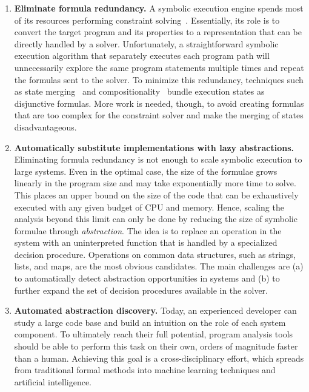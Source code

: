 \begin{enumerate}
\item \textbf{Eliminate formula redundancy.}  A symbolic execution engine spends most of its resources performing constraint solving~\cite{klee}.  Essentially, its role is to convert the target program and its properties to a representation that can be directly handled by a solver.
%
Unfortunately, a straightforward symbolic execution algorithm that separately executes each program path will unnecessarily explore the same program statements multiple times and repeat the formulas sent to the solver.
%
To minimize this redundancy, techniques such as state merging~\cite{state-merging} and compositionality~\cite{godefroid:compdyntest} bundle execution states as disjunctive formulas.
%
More work is needed, though, to avoid creating formulas that are too complex for the constraint solver and make the merging of states disadvantageous.


\item \textbf{Automatically substitute implementations with lazy abstractions.}  Eliminating formula redundancy is not enough to scale symbolic execution to large systems.
%
Even in the optimal case, the size of the formulae grows linearly in the program size and may take exponentially more time to solve.  This places an upper bound on the size of the code that can be exhaustively executed with any given budget of CPU and memory.
%
Hence, scaling the analysis beyond this limit can only be done by reducing the size of symbolic formulae through \emph{abstraction}.  The idea is to replace an operation in the system with an uninterpreted function that is handled by a specialized decision procedure.
%
Operations on common data structures, such as strings, lists, and maps, are the most obvious candidates.  The main challenges are (a) to automatically detect abstraction opportunities in systems and (b) to further expand the set of decision procedures available in the solver.

  
\item \textbf{Automated abstraction discovery.}  Today, an experienced developer can study a large code base and build an intuition on the role of each system component.
%
To ultimately reach their full potential, program analysis tools should be able to perform this task on their own, orders of magnitude faster than a human.
%
Achieving this goal is a cross-disciplinary effort, which spreads from traditional formal methods into machine learning techniques and artificial intelligence.
\end{enumerate}






